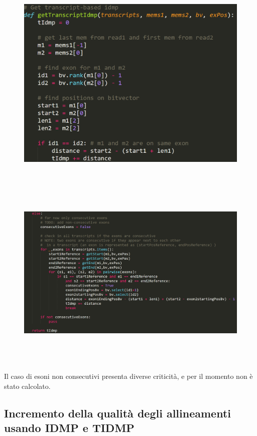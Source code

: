 \begin{figure}[h!]
	\centering
	\includegraphics[width=\linewidth, height=9.5cm]{images/gettIDMP1.png}
  \label{fig:GettIDMP1}
\end{figure}

\newpage

\begin{figure}[h!]
	\centering
	\includegraphics[width=\linewidth, height=9.5cm]{images/gettIDMP2.png}
  \label{fig:GettIDMP2}
\end{figure}

Il caso di esoni non consecutivi presenta diverse criticità, e per il momento non è stato calcolato.

\newpage

\subsection{Incremento della qualità degli allineamenti usando IDMP e TIDMP}


